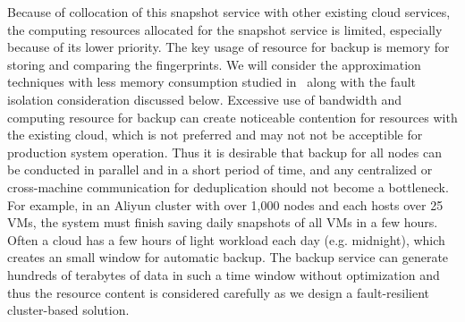 Because of collocation of this snapshot service with other existing cloud services, 
the computing resources allocated for the snapshot service is limited, especially
because of its lower priority.
The key usage of resource for backup is memory for storing and comparing the fingerprints. 
We will consider the approximation techniques with less memory consumption
studied in~\cite{extreme_binning09,Guo2011} along with the fault isolation consideration discussed below. 
Excessive use of bandwidth and computing resource for backup can create
noticeable contention for resources with the existing cloud, which is not
preferred and may not not be acceptible for production system operation. 
Thus it is desirable that backup for all nodes
can be conducted in parallel and in a short period of time,
and any centralized or cross-machine communication for
deduplication should not become a bottleneck.
For example, in an Aliyun cluster with over 1,000 nodes and each hosts over 25 VMs, 
the system must finish saving daily snapshots of all VMs in a few hours. 
Often a cloud has a few hours of light workload each day (e.g. midnight),  
which creates an small window for automatic backup.
The backup service can generate hundreds of terabytes of data in such a time window
without optimization and thus the resource content is considered carefully as we design
a fault-resilient cluster-based solution. 




